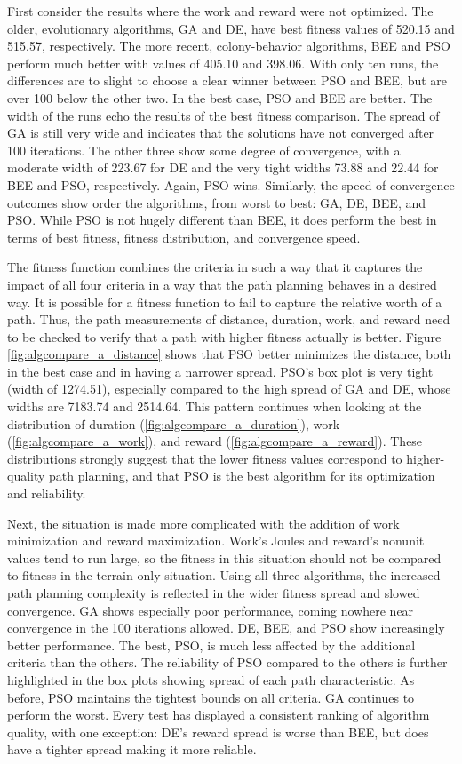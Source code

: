 \documentclass{tamuccthesis}
\begin{document}
First consider the results where the work and reward were not optimized. The older, evolutionary algorithms, GA and DE, have best fitness values of 520.15 and 515.57, respectively. The more recent, colony-behavior algorithms, BEE and PSO perform much better with values of 405.10 and 398.06. With only ten runs, the differences are to slight to choose a clear winner between PSO and BEE, but are over 100 below the other two. In the best case, PSO and BEE are better. The width of the runs echo the results of the best fitness comparison. The spread of GA is still very wide and indicates that the solutions have not converged after 100 iterations. The other three show some degree of convergence, with a moderate width of 223.67 for DE and the very tight widths 73.88 and 22.44 for BEE and PSO, respectively. Again, PSO wins. Similarly, the speed of convergence outcomes show order the algorithms, from worst to best: GA, DE, BEE, and PSO. While PSO is not hugely different than BEE, it does perform the best in terms of best fitness, fitness distribution, and convergence speed.

The fitness function combines the criteria in such a way that it captures the impact of all four criteria in a way that the path planning behaves in a desired way. It is possible for a fitness function to fail to capture the relative worth of a path. Thus, the path measurements of distance, duration, work, and reward need to be checked to verify that a path with higher fitness actually is better. Figure \ref{fig:algcompare_a_distance} shows that PSO better minimizes the distance, both in the best case and in having a narrower spread. PSO's box plot is very tight (width of 1274.51), especially compared to the high spread of GA and DE, whose widths are 7183.74 and 2514.64. This pattern continues when looking at the distribution of duration (\ref{fig:algcompare_a_duration}), work (\ref{fig:algcompare_a_work}), and reward (\ref{fig:algcompare_a_reward}). These distributions strongly suggest that the lower fitness values correspond to higher-quality path planning, and that PSO is the best algorithm for its optimization and reliability. 

Next, the situation is made more complicated with the addition of work minimization and reward maximization. Work's Joules and reward's nonunit values tend to run large, so the fitness in this situation should not be compared to fitness in the terrain-only situation. Using all three algorithms, the increased path planning complexity is reflected in the wider fitness spread and slowed convergence. GA shows especially poor performance, coming nowhere near convergence in the 100 iterations allowed. DE, BEE, and PSO show increasingly better performance. The best, PSO, is much less affected by the additional criteria than the others. The reliability of PSO compared to the others is further highlighted in the box plots showing spread of each path characteristic. As before, PSO maintains the tightest bounds on all criteria. GA continues to perform the worst. Every test has displayed a consistent ranking of algorithm quality, with one exception: DE's reward spread is worse than BEE, but does have a tighter spread making it more reliable. 
\end{document}
